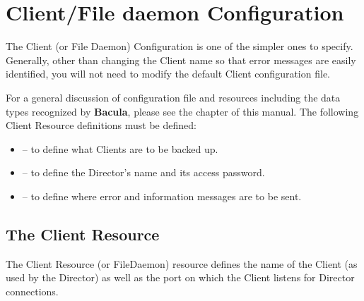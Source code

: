 
\chapter{Client/File daemon Configuration}
\label{FiledConfChapter}

The Client (or File Daemon) Configuration is one of the simpler ones to
specify. Generally, other than changing the Client name so that error messages
are easily identified, you will not need to modify the default Client
configuration file. 

For a general discussion of configuration file and resources including the
data types recognized by {\bf Bacula}, please see the 
 chapter of this manual. The
following Client Resource definitions must be defined: 

\begin{itemize}
\item 
    -- to define what Clients are  to
   be backed up.  
\item 
    -- to  define the Director's
   name and its access password.  
\item 
    -- to define where error  and
   information messages are to be sent. 
\end{itemize}

\section{The Client Resource}
\label{ClientResource}

The Client Resource (or FileDaemon) resource defines the name of the Client
(as used by the Director) as well as the port on which the Client listens for
Director connections. 

